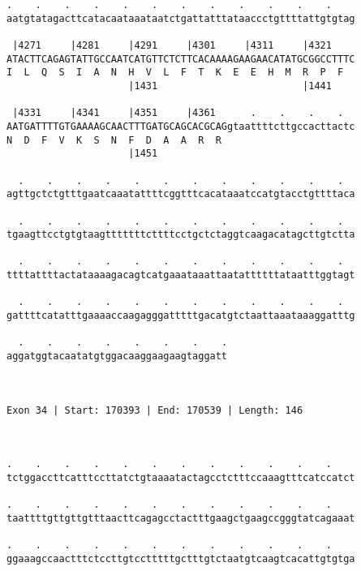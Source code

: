 \documentclass{article}
\begin{document}
\begin{Verbatim}
.    .    .    .    .    .    .    .    .    .    .    .    
aatgtatagacttcatacaataaataatctgattatttataaccctgttttattgtgtag
                                                            
 |4271     |4281     |4291     |4301     |4311     |4321    
ATACTTCAGAGTATTGCCAATCATGTTCTCTTCACAAAAGAAGAACATATGCGGCCTTTC
I  L  Q  S  I  A  N  H  V  L  F  T  K  E  E  H  M  R  P  F  
                     |1431                         |1441    
  
 |4331     |4341     |4351     |4361      .    .    .    .  
AATGATTTTGTGAAAAGCAACTTTGATGCAGCACGCAGgtaattttcttgccacttactc
N  D  F  V  K  S  N  F  D  A  A  R  R                       
                     |1451                                  
  
  .    .    .    .    .    .    .    .    .    .    .    .  
agttgctctgtttgaatcaaatattttcggtttcacataaatccatgtacctgttttaca
                                                            
  .    .    .    .    .    .    .    .    .    .    .    .  
tgaagttcctgtgtaagtttttttcttttcctgctctaggtcaagacatagcttgtctta
                                                            
  .    .    .    .    .    .    .    .    .    .    .    .  
ttttattttactataaaagacagtcatgaaataaattaatattttttataatttggtagt
                                                            
  .    .    .    .    .    .    .    .    .    .    .    .  
gattttcatatttgaaaaccaagagggatttttgacatgtctaattaaataaaggatttg
                                                            
  .    .    .    .    .    .    .    .
aggatggtacaatatgtggacaaggaagaagtaggatt
                                      
                                      
 
Exon 34 | Start: 170393 | End: 170539 | Length: 146



.    .    .    .    .    .    .    .    .    .    .    .    
tctggaccttcatttccttatctgtaaaatactagcctctttccaaagtttcatccatct
                                                            
.    .    .    .    .    .    .    .    .    .    .    .    
taattttgttgttgtttaacttcagagcctactttgaagctgaagccgggtatcagaaat
                                                            
.    .    .    .    .    .    .    .    .    .    .    .    
ggaaagccaactttctccttgtcctttttgctttgtctaatgtcaagtcacattgtgtga
                                                            

\end{Verbatim}
\end{document}
